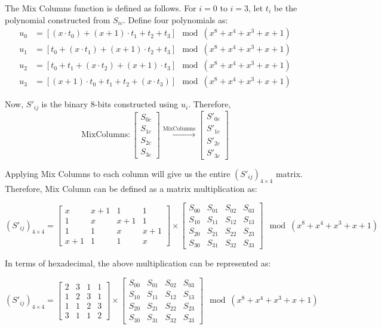 \documentclass[11pt]{article}
\begin{document}
The Mix Columns function is defined as follows. For $i = 0$ to $i = 3$, let $t_i$ be the polynomial constructed from $S_{ic}$. Define four polynomials as:
\begin{align*}
u_0 &= [(x \cdot t_0) + (x + 1) \cdot t_1 + t_2 + t_3] \mod (x^8 + x^4 + x^3 + x + 1) \\
u_1 &= [t_0 + (x \cdot t_1) + (x + 1) \cdot t_2 + t_3] \mod (x^8 + x^4 + x^3 + x + 1) \\
u_2 &= [t_0 + t_1 + (x \cdot t_2) + (x + 1) \cdot t_3] \mod (x^8 + x^4 + x^3 + x + 1) \\
u_3 &= [(x + 1) \cdot t_0 + t_1 + t_2 + (x \cdot t_3)] \mod (x^8 + x^4 + x^3 + x + 1)
\end{align*}

Now, $S'_{ij}$ is the binary 8-bits constructed using $u_i$. Therefore,
\[ \text{MixColumns}:
\begin{bmatrix}
S_{0c} \\
S_{1c} \\
S_{2c} \\
S_{3c}
\end{bmatrix}
\xrightarrow{\text{MixColumns}}
\begin{bmatrix}
S'_{0c} \\
S'_{1c} \\
S'_{2c} \\
S'_{3c}
\end{bmatrix}
\]

Applying Mix Columns to each column will give us the entire $(S'_{ij})_{4 \times 4}$ matrix. Therefore, Mix Column can be defined as a matrix multiplication as:

\[
(S'_{ij})_{4 \times 4} =
\begin{bmatrix}
x & x + 1 & 1 & 1 \\
1 & x & x + 1 & 1 \\
1 & 1 & x & x + 1 \\
x + 1 & 1 & 1 & x
\end{bmatrix}
\times
\begin{bmatrix}
S_{00} & S_{01} & S_{02} & S_{03} \\
S_{10} & S_{11} & S_{12} & S_{13} \\
S_{20} & S_{21} & S_{22} & S_{23} \\
S_{30} & S_{31} & S_{32} & S_{33}
\end{bmatrix}
\mod (x^8 + x^4 + x^3 + x + 1)
\]

In terms of hexadecimal, the above multiplication can be represented as:

\[
(S'_{ij})_{4 \times 4} =
\begin{bmatrix}
2 & 3 & 1 & 1 \\
1 & 2 & 3 & 1 \\
1 & 1 & 2 & 3 \\
3 & 1 & 1 & 2
\end{bmatrix}
\times
\begin{bmatrix}
S_{00} & S_{01} & S_{02} & S_{03} \\
S_{10} & S_{11} & S_{12} & S_{13} \\
S_{20} & S_{21} & S_{22} & S_{23} \\
S_{30} & S_{31} & S_{32} & S_{33}
\end{bmatrix}
\mod (x^8 + x^4 + x^3 + x + 1)
\]
\end{document}
